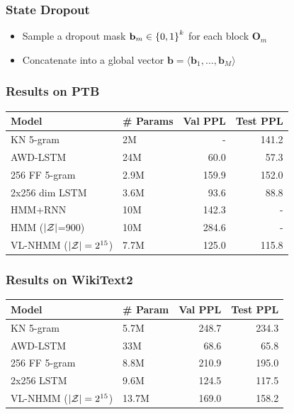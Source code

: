 \documentclass{beamer}
\begin{document}
\begin{frame}
\frametitle{State Dropout}
\begin{itemize}
\item Sample a dropout mask $\mathbf{b}_m \in \left\{0,1\right\}^k$ for each block $\mathbf{O}_m$
\item Concatenate into a global vector $\mathbf{b} = \langle \mathbf{b}_1, \ldots, \mathbf{b}_M \rangle$
\end{itemize}

\vspace{1em}
\centering
\resizebox{2in}{2in}{

}
\end{frame}

\begin{frame}
\frametitle{Results on PTB}

\begin{table}[!t]
\centering
\begin{tabular}{llrr}
\toprule
Model & \# Params & Val PPL  & Test PPL\\
\midrule
KN 5-gram   & 2M & - & 141.2\\
AWD-LSTM  & 24M & 60.0 & 57.3\\
256 FF 5-gram  & 2.9M     & 159.9      & 152.0  \\
2x256 dim LSTM  & 3.6M     & 93.6       & 88.8   \\
HMM+RNN   & 10M & 142.3 & -\\
HMM ($|\mathcal{Z}|$=900) & 10M & 284.6 & -\\
VL-NHMM ($|\mathcal{Z}|=2^{15}$)   & 7.7M     & 125.0      & 115.8  \\
\bottomrule
\end{tabular}
\end{table}

\end{frame}

\begin{frame}
\frametitle{Results on WikiText2}

\begin{table}[!t]
\centering
\begin{tabular}{llrr}
\toprule
Model & \# Param & Val PPL & Test PPL\\
\midrule
KN 5-gram & 5.7M       & 248.7 & 234.3\\
AWD-LSTM & 33M & 68.6 & 65.8\\
256 FF 5-gram        & 8.8M    & 210.9  & 195.0\\
2x256  LSTM     & 9.6M    & 124.5  & 117.5\\
VL-NHMM ($|\mathcal{Z}|=2^{15}$)           & 13.7M   & 169.0      & 158.2\\
\bottomrule
\end{tabular}
\end{table}

\end{frame}
\end{document}
